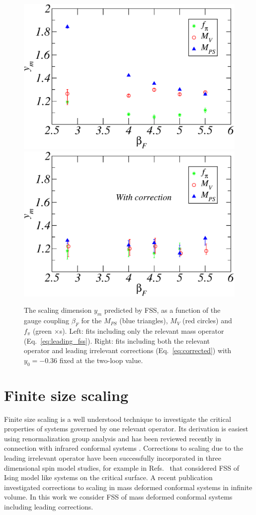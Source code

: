 \documentclass[aps,prl,twocolumn,]{revtex4-1}  %
\newcommand{\eq}[1]{Eq.~\ref{#1}}
\begin{document}
\begin{figure}[tb]
\centering
  \includegraphics[width=0.45\linewidth]{ym_c0} \hfill
  \includegraphics[width=0.45\linewidth]{ym}
   \caption{\label{fig:scaling_exp} The scaling dimension $y_m$ predicted by FSS, as a function of the gauge coupling $\beta_F$ for the $M_{PS}$ (blue triangles), $M_V$ (red circles) and $f_\pi$ (green $\times$s).  Left: fits including only the relevant mass operator (\protect\eq{eq:leading_fss}).  Right: fits including both the relevant operator and leading irrelevant corrections (\protect\eq{eq:corrected}) with $y_0=-0.36$ fixed at the two-loop value.}
 \end{figure}


\section{Finite size scaling}


Finite size scaling is a well understood technique  to  investigate the critical properties of systems governed by one relevant operator.
Its derivation is easiest using renormalization group analysis and has been reviewed recently in connection with infrared conformal systems \cite{DeGrand:2009mt, DelDebbio:2010ze}.
Corrections to scaling due to the leading irrelevant operator have been successfully incorporated in  three dimensional spin model studies, for example in Refs.~\cite{Hasenbusch:1999mw,Hasenbusch:2011yya} that considered FSS of Ising model like systems on the critical surface.  A recent publication~\cite{DelDebbio:2013qta} investigated  corrections to scaling  in mass deformed conformal systems  in infinite volume.
In this work we consider FSS of mass deformed conformal systems including leading corrections.
\end{document}
